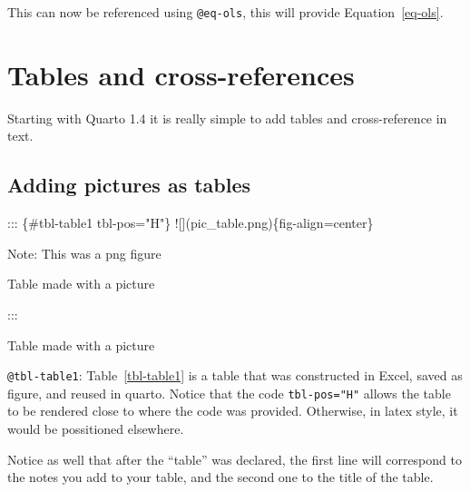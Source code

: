 \documentclass[
  12pt,
]{article}
\newenvironment{Shaded}{\begin{snugshade}}{\end{snugshade}}
\newcommand{\AlertTok}[1]{\textcolor[rgb]{0.68,0.00,0.00}{#1}}
\newcommand{\NormalTok}[1]{\textcolor[rgb]{0.00,0.23,0.31}{#1}}
\begin{document}
This can now be referenced using \texttt{@eq-ols}, this will provide
Equation~\ref{eq-ols}.

\section{Tables and cross-references}\label{tables-and-cross-references}

Starting with Quarto 1.4 it is really simple to add tables and
cross-reference in text.

\subsection{Adding pictures as tables}\label{adding-pictures-as-tables}

\begin{Shaded}
\begin{Highlighting}[]
\NormalTok{::: \{\#tbl{-}table1 tbl{-}pos="H"\}}
\AlertTok{![](pic\_table.png)}\NormalTok{\{fig{-}align=center\}}

\NormalTok{Note: This was a png figure}

\NormalTok{Table made with a picture}

\NormalTok{:::}
\end{Highlighting}
\end{Shaded}

\begin{table}[H]

\caption{\label{tbl-table1}Table made with a picture}


\end{table}%

\texttt{@tbl-table1}: Table~\ref{tbl-table1} is a table that was
constructed in Excel, saved as figure, and reused in quarto. Notice that
the code \texttt{tbl-pos="H"} allows the table to be rendered close to
where the code was provided. Otherwise, in latex style, it would be
possitioned elsewhere.

Notice as well that after the ``table'' was declared, the first line
will correspond to the notes you add to your table, and the second one
to the title of the table.
\end{document}
